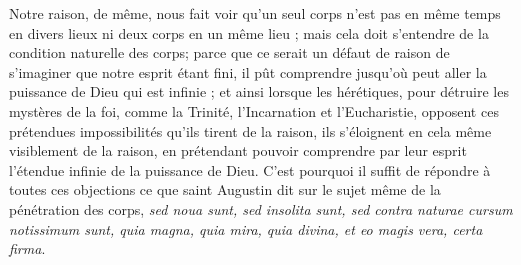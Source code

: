 Notre raison, de même, nous fait voir qu'un seul corps n'est pas en même temps en divers lieux ni deux corps en un même lieu ; mais cela doit s'entendre de la condition naturelle des corps; parce que ce serait un défaut de raison de s'imaginer que notre esprit étant fini, il pût comprendre jusqu'où peut aller la puissance de Dieu qui est infinie ; et ainsi lorsque les hérétiques, pour détruire les mystères de la foi, comme la Trinité, l'Incarnation et l'Eucharistie, opposent ces prétendues impossibilités qu'ils tirent de la raison, ils s'éloignent en cela même visiblement de la raison, en prétendant pouvoir comprendre par leur esprit l'étendue infinie de la puissance de Dieu. C'est pourquoi il suffit de répondre à toutes ces objections ce que saint Augustin dit sur le sujet même de la pénétration des corps, \emph{sed noua sunt, sed insolita sunt, sed contra naturae cursum notissimum sunt, quia magna, quia mira, quia divina, et eo magis vera, certa firma}.

